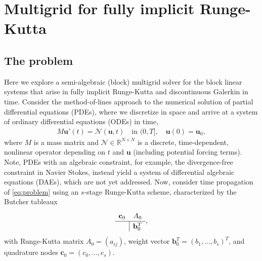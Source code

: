 \documentclass[a4paper,10pt]{article}
\begin{document}
\allowdisplaybreaks

\section{Multigrid for fully implicit Runge-Kutta}\label{sec:mg}

\subsection{The problem}\label{sec:mg:prob}

Here we explore a semi-algebraic (block) multigrid solver for the block
linear systems that arise in fully implicit Runge-Kutta and discontinuous
Galerkin in time.
Consider the method-of-lines approach to the numerical solution of partial differential
equations (PDEs), where we discretize in space and arrive at a system of ordinary
differential equations (ODEs) in time,
%
\begin{align}\label{eq:problem}
	M\mathbf{u}'(t) =  \mathcal{N}(\mathbf{u},t) \quad\text{in }(0,T], \quad \mathbf{u}(0) = \mathbf{u}_0,
\end{align}
%
where $M$ is a mass matrix and $\mathcal{N}\in\mathbb{R}^{N\times N}$ is a discrete,
time-dependent, nonlinear operator depending on $t$ and $\mathbf{u}$ (including potential
forcing terms). Note, PDEs with an algebraic constraint, for example, the divergence-free
constraint in Navier Stokes, instead yield a system of differential algebraic equations
(DAEs), which are not yet addressed. 
Now, consider time propagation of \eqref{eq:problem} using an $s$-stage
Runge-Kutta scheme, characterized by the Butcher tableaux 
%
\begin{align*}
	\renewcommand\arraystretch{1.2}
	\begin{array}
	{c|c}
	\mathbf{c}_0 & A_0\\
	\hline
	& \mathbf{b}_0^T
	\end{array},
\end{align*}
%
with Runge-Kutta matrix $A_0 = (a_{ij})$, weight vector $\mathbf{b}_0^T = (b_1, \ldots, b_s)^T$,
and quadrature nodes $\mathbf{c}_0 = (c_0, \ldots, c_s)$.
\end{document}
